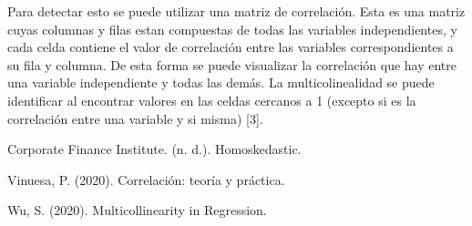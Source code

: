 \documentclass[]{article}
\begin{document}
\begin{enumerate}
    Para detectar esto se puede utilizar una matriz de correlación. Esta es una matriz cuyas columnas
    y filas estan compuestas de todas las variables independientes, y cada celda contiene el valor de 
    correlación entre las variables correspondientes a su fila y columna. De esta forma se puede 
    visualizar la correlación que hay entre una variable independiente y todas las demás. La multicolinealidad
    se puede identificar al encontrar valores en las celdas cercanos a 1 (excepto si es la correlación entre 
    una variable y si misma) [3].

\end{enumerate}

\newpage

\begin{thebibliography}{9}
    Corporate Finance Institute. (n. d.). Homoskedastic.\\
    
    Vinuesa, P. (2020). Correlación: teoría y práctica.\\

    Wu, S. (2020). Multicollinearity in Regression.\\

    \end{thebibliography}
\end{document}

